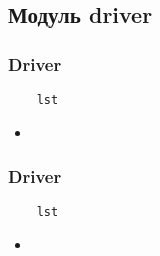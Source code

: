 \subsection{Модуль driver}

\subsubsection{Driver}

\begin{lstlisting}
    lst
\end{lstlisting}

\begin{itemize}
    \item \verb||
\end{itemize}

\subsubsection{Driver}

\begin{lstlisting}
    lst
\end{lstlisting}

\begin{itemize}
    \item \verb||
\end{itemize}

